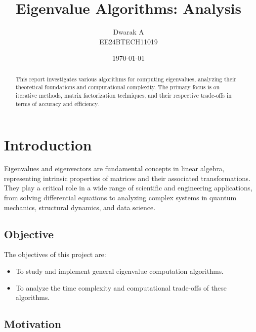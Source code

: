 \documentclass[12pt]{article}
\title{Eigenvalue Algorithms: Analysis}
\author{Dwarak A\\EE24BTECH11019}
\date{\today}
\numberwithin{equation}{subsubsection}
\begin{document}
\maketitle

\begin{abstract}
	This report investigates various algorithms for computing eigenvalues, analyzing their theoretical foundations and computational complexity. The primary focus is on iterative methods, matrix factorization techniques, and their respective trade-offs in terms of accuracy and efficiency.
\end{abstract}

\tableofcontents
\newpage

\section{Introduction}
Eigenvalues and eigenvectors are fundamental concepts in linear algebra, representing intrinsic properties of matrices and their associated transformations. They play a critical role in a wide range of scientific and engineering applications, from solving differential equations to analyzing complex systems in quantum mechanics, structural dynamics, and data science.

\subsection{Objective}
The objectives of this project are:
\begin{itemize}
	\item To study and implement general eigenvalue computation algorithms.
	\item To analyze the time complexity and computational trade-offs of these algorithms.
\end{itemize}

\subsection{Motivation}
\end{document}
